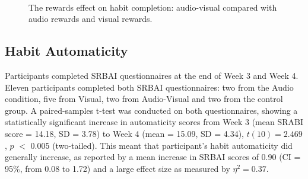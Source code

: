 \documentclass{scaffold/sigchi}
\begin{document}
\begin{figure}
  \centering
  \caption{The rewards effect on habit completion: audio-visual compared with audio rewards and visual rewards.}~\label{fig:m1_h2}
\end{figure}

\subsection{Habit Automaticity}
Participants completed SRBAI questionnaires at the end of Week 3 and Week 4. Eleven participants completed both SRBAI questionnaires: two from the Audio condition, five from Visual, two from Audio-Visual and two from the control group. A paired-samples t-test was conducted on both questionnaires, showing a statistically significant increase in automaticity scores from Week 3 (mean SRABI score = 14.18, SD = 3.78) to Week 4 (mean = 15.09, SD = 4.34), $t(10) = 2.469$, $p$ $<$ $0.005$ (two-tailed). This meant that participant's habit automaticity did generally increase, as reported by a mean increase in SRBAI scores of 0.90 (CI = 95\%, from 0.08 to 1.72) and a large effect size as measured by $\eta^{2} = 0.37$.
\end{document}
